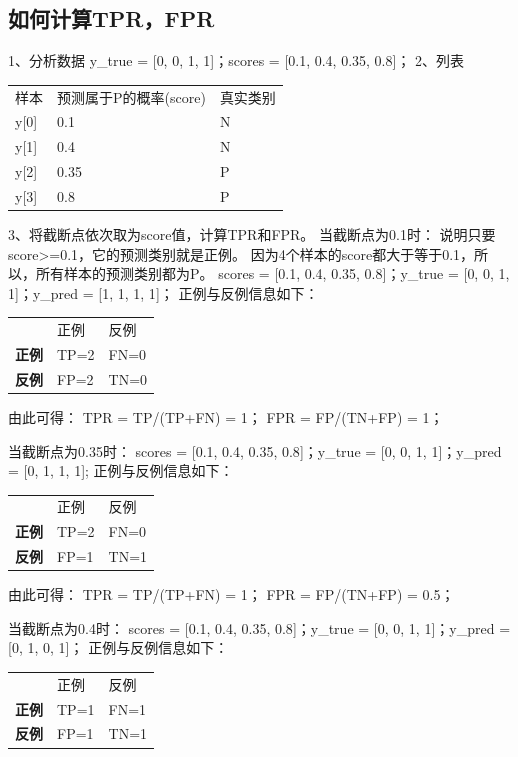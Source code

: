 
\subsection{如何计算TPR，FPR}\label{ux5982ux4f55ux8ba1ux7b97tprfpr}

1、分析数据 y\_true = {[}0, 0, 1, 1{]}；scores = {[}0.1, 0.4, 0.35,
0.8{]}； 2、列表

\begin{longtable}[]{ lll }
样本 & 预测属于P的概率(score) & 真实类别\tabularnewline
y{[}0{]} & 0.1 & N\tabularnewline
y{[}1{]} & 0.4 & N\tabularnewline
y{[}2{]} & 0.35 & P\tabularnewline
y{[}3{]} & 0.8 & P\tabularnewline
\end{longtable}

3、将截断点依次取为score值，计算TPR和FPR。 当截断点为0.1时：
说明只要score\textgreater{}=0.1，它的预测类别就是正例。
因为4个样本的score都大于等于0.1，所以，所有样本的预测类别都为P。 scores
= {[}0.1, 0.4, 0.35, 0.8{]}；y\_true = {[}0, 0, 1, 1{]}；y\_pred = {[}1,
1, 1, 1{]}； 正例与反例信息如下：

\begin{longtable}[]{ lll }
& 正例 & 反例\tabularnewline
\textbf{正例} & TP=2 & FN=0\tabularnewline
\textbf{反例} & FP=2 & TN=0\tabularnewline
\end{longtable}

由此可得： TPR = TP/(TP+FN) = 1； FPR = FP/(TN+FP) = 1；

当截断点为0.35时： scores = {[}0.1, 0.4, 0.35, 0.8{]}；y\_true = {[}0,
0, 1, 1{]}；y\_pred = {[}0, 1, 1, 1{]}; 正例与反例信息如下：

\begin{longtable}[]{ lll }
& 正例 & 反例\tabularnewline
\textbf{正例} & TP=2 & FN=0\tabularnewline
\textbf{反例} & FP=1 & TN=1\tabularnewline
\end{longtable}

由此可得： TPR = TP/(TP+FN) = 1； FPR = FP/(TN+FP) = 0.5；

当截断点为0.4时： scores = {[}0.1, 0.4, 0.35, 0.8{]}；y\_true = {[}0, 0,
1, 1{]}；y\_pred = {[}0, 1, 0, 1{]}； 正例与反例信息如下：

\begin{longtable}[]{ lll }
& 正例 & 反例\tabularnewline
\textbf{正例} & TP=1 & FN=1\tabularnewline
\textbf{反例} & FP=1 & TN=1\tabularnewline
\end{longtable}

